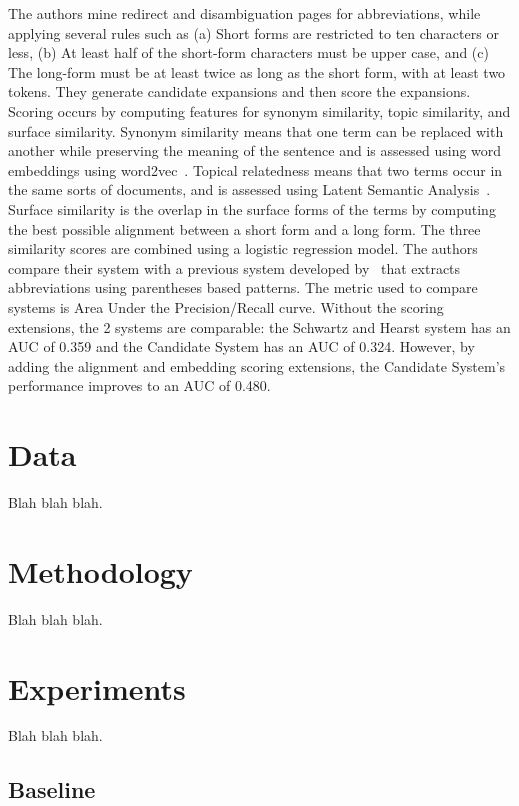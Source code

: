 \documentclass[11pt,a4paper]{article}
\begin{document}
The authors mine redirect and disambiguation pages for abbreviations, while applying several rules such as (a) Short forms are restricted to ten characters or less, (b) At least half of the short-form characters must be upper case, and (c) The long-form must be at least twice as long as the short form, with at least two tokens.  They generate candidate expansions and then score the expansions.  Scoring occurs by computing features for synonym similarity, topic similarity, and surface similarity.  Synonym similarity means that one term can be replaced with another while preserving the meaning of the sentence and is assessed using word embeddings using word2vec~\cite{NIPS2013_5021}.  Topical relatedness means that two terms occur in the same sorts of documents, and is assessed using Latent Semantic Analysis~\cite{deerwester-indexing-1990}.  Surface similarity is the overlap in the surface forms of the terms by computing the best possible alignment between a short form and a long form.   The three similarity scores are combined using a logistic regression model.
The authors compare their system with a previous system developed by~\cite{SchwartzH03} that extracts abbreviations using parentheses based patterns.  The metric used to compare systems is Area Under the Precision/Recall curve.  Without the scoring extensions, the 2 systems are comparable: the Schwartz and Hearst system has an AUC of 0.359 and the Candidate System has an AUC of 0.324.  However, by adding the alignment and embedding scoring extensions, the Candidate System’s performance improves to an AUC of 0.480.


\section{Data}

Blah blah blah.

\section{Methodology}

Blah blah blah.

\section{Experiments}

Blah blah blah.

\subsection{Baseline}
\end{document}
